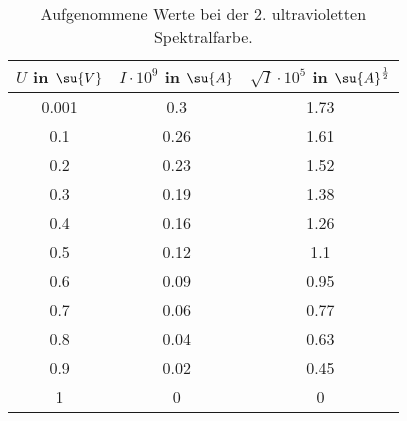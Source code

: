 \begin{table}
  \centering
  \label{tab:Gelb_Komplett}
  \caption{Aufgenommene Werte bei der 2. ultravioletten Spektralfarbe.}
  \begin{tabular}{c c c}
    \toprule
    $U$ in $\su{V}$ & $I\cdot 10^{9}$ in $\su{A}$ & $\sqrt{I}\cdot10^{5}$ in $\su{A}^{\frac{1}{2}}$ \\
    \midrule
    0.001 & 0.3  & 1.73 \\
    0.1   & 0.26 & 1.61 \\
    0.2   & 0.23 & 1.52 \\
    0.3   & 0.19 & 1.38 \\
    0.4   & 0.16 & 1.26 \\
    0.5   & 0.12 & 1.1  \\
    0.6   & 0.09 & 0.95 \\
    0.7   & 0.06 & 0.77 \\
    0.8   & 0.04 & 0.63 \\
    0.9   & 0.02 & 0.45 \\
    1     & 0    & 0    \\
    \bottomrule
  \end{tabular}
\end{table}
